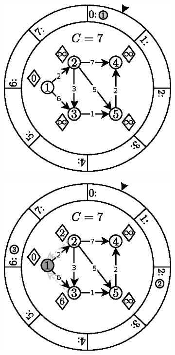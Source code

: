 \begin{figure}[!htbp]
	\centering
	\begin{subfigure}[b]{0.33\textwidth}
		\includegraphics[width=\textwidth]{Chapter_II/2/a.eps}
		\caption{}
	\end{subfigure}%
	\begin{subfigure}[b]{0.33\textwidth}
		\includegraphics[width=\textwidth]{Chapter_II/2/b.eps}

\end{subfigure}
\end{figure}
